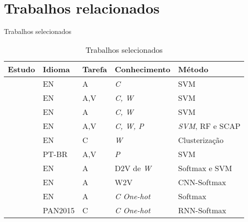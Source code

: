 \section{Trabalhos relacionados}

\begin{frame}{Trabalhos selecionados}
\setlength{\tabcolsep}{5pt}\selectFont
\begin{table}[]
	\caption{Trabalhos selecionados}
	\begin{tabular}{lllll}
		\toprule
		{ Estudo}                   & {  Idioma}     & { Tarefa} & {  Conhecimento}      & {  Método}           \\ \toprule
		\citeonline{aa-Sapkota2015} & EN             & A         & {\it C}               & SVM                  \\ \hline
		\citeonline{aa-distortion}  & EN             & A,V       & {\it C, W}            & SVM                  \\ \midrule
		\citeonline{Schwartz2013}   & EN             & A         & {\it C, W}            & SVM                  \\ \hline
		\citeonline{aa-rocha-2017}  & EN             & A,V       & {\it C, W, P}         & {\it SVM}, RF e SCAP \\ \midrule
		\citeonline{AA_delta2017}   & EN             & C         & {\it W}               & Clusterização        \\ \hline
		\citeonline{Varela2016}     & PT-BR          & A,V       & {\it P}               & SVM                  \\ \hline
		\citeonline{posadas2017}    & EN             & A         & D2V de {\it W}        & Softmax e SVM        \\ \hline
		\citeonline{RhodesCS224D}   & EN             & A         & W2V                   & CNN-Softmax          \\ \hline
		\citeonline{Shrestha2017}   & EN             & A         & {\it C One-hot}       & Softmax              \\ \hline
		\citeonline{Bagnall2016}    & PAN2015 & C         & {\it C One-hot}       & RNN-Softmax          \\ \bottomrule
	\end{tabular}
	\label{tab:revisao_sumarizacao_geral}
	\SourcePadrao
\end{table}
\end{frame}